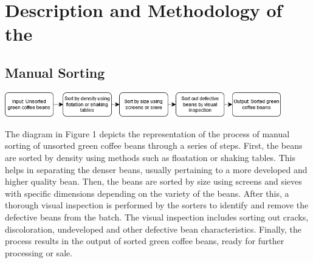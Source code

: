 \section{Description and Methodology of the \documentType}
\subsection{Manual Sorting}
\begin{center}
\includegraphics[width=0.9\textwidth]{figure/manual_sorting.png} 
\end{center}

The diagram in Figure 1 depicts the representation of the process of manual sorting of unsorted green coffee beans through a series of steps. First, the beans are sorted by density using methods such as floatation or shaking tables. This helps in separating the denser beans, usually pertaining to a more developed and higher quality bean. Then, the beans are sorted by size using screens and sieves with specific dimensions depending on the variety of the beans. After this, a thorough visual inspection is performed by the sorters to identify and remove the defective beans from the batch. The visual inspection includes sorting out cracks, discoloration, undeveloped and other defective bean characteristics. Finally, the process results in the output of sorted green coffee beans, ready for further processing or sale. 


